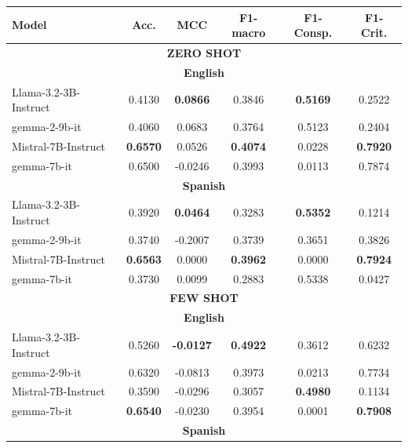 \documentclass{Configuration_Files/PoliMi3i_thesis}
\begin{document}
\begin{table}[h]
    \centering
    \small
    \begin{tabular}{lccccc}
        \hline
        \textbf{Model} & \textbf{Acc.} & \textbf{MCC} & \textbf{F1-macro} & \textbf{F1-Consp.} & \textbf{F1-Crit.}   \\
        \hline
        \multicolumn{6}{c}{\textbf{ZERO SHOT}} \\
        \hline
        \multicolumn{6}{c}{\textbf{English}} \\
        \hline
        Llama-3.2-3B-Instruct & 0.4130 & \textbf{0.0866} & 0.3846 & \textbf{0.5169}  & 0.2522  \\   
        gemma-2-9b-it         & 0.4060 & 0.0683 & 0.3764 & 0.5123 & 0.2404   \\   
        Mistral-7B-Instruct   & \textbf{0.6570} & 0.0526 & \textbf{0.4074} & 0.0228 & \textbf{0.7920}  \\   
        gemma-7b-it           & 0.6500 & -0.0246 & 0.3993 & 0.0113 & 0.7874  \\   
        \hline
        \multicolumn{6}{c}{\textbf{Spanish}} \\
        \hline
        Llama-3.2-3B-Instruct & 0.3920 & \textbf{0.0464} & 0.3283 & \textbf{0.5352}  & 0.1214  \\
        gemma-2-9b-it         & 0.3740 & -0.2007 & 0.3739 & 0.3651 & 0.3826   \\   
        Mistral-7B-Instruct   & \textbf{0.6563} & 0.0000 & \textbf{0.3962} & 0.0000 & \textbf{0.7924}   \\   
        gemma-7b-it           & 0.3730 & 0.0099 & 0.2883 & 0.5338 & 0.0427   \\  
        \hline
        \hline
        \multicolumn{6}{c}{\textbf{FEW SHOT}} \\
        \hline
        \multicolumn{6}{c}{\textbf{English}} \\
        \hline
        Llama-3.2-3B-Instruct & 0.5260 & \textbf{-0.0127} & \textbf{0.4922} & 0.3612  & 0.6232  \\   
        gemma-2-9b-it         & 0.6320 & -0.0813 & 0.3973 & 0.0213 & 0.7734   \\        
        Mistral-7B-Instruct   & 0.3590 & -0.0296 & 0.3057 & \textbf{0.4980} & 0.1134   \\       
        gemma-7b-it           & \textbf{0.6540} & -0.0230 & 0.3954 & 0.0001 & \textbf{0.7908} \\
        \hline
        \multicolumn{6}{c}{\textbf{Spanish}} \\

\end{tabular}
\end{table}
\end{document}
